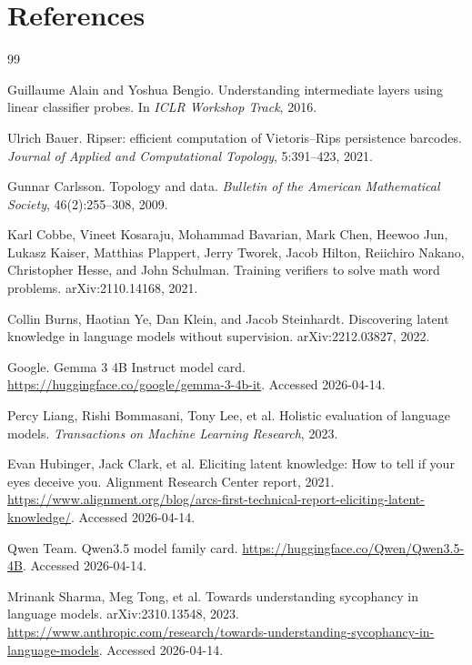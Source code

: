 \documentclass[11pt]{article}
\begin{document}
\section*{References}
\renewcommand{\refname}{}
\begin{thebibliography}{99}

Guillaume Alain and Yoshua Bengio.
\newblock Understanding intermediate layers using linear classifier probes.
\newblock In \emph{ICLR Workshop Track}, 2016.

Ulrich Bauer.
\newblock Ripser: efficient computation of Vietoris--Rips persistence barcodes.
\newblock \emph{Journal of Applied and Computational Topology}, 5:391--423, 2021.

Gunnar Carlsson.
\newblock Topology and data.
\newblock \emph{Bulletin of the American Mathematical Society}, 46(2):255--308, 2009.

Karl Cobbe, Vineet Kosaraju, Mohammad Bavarian, Mark Chen, Heewoo Jun, Lukasz Kaiser, Matthias Plappert, Jerry Tworek, Jacob Hilton, Reiichiro Nakano, Christopher Hesse, and John Schulman.
\newblock Training verifiers to solve math word problems.
\newblock arXiv:2110.14168, 2021.

Collin Burns, Haotian Ye, Dan Klein, and Jacob Steinhardt.
\newblock Discovering latent knowledge in language models without supervision.
\newblock arXiv:2212.03827, 2022.

Google.
\newblock Gemma 3 4B Instruct model card.
\newblock \url{https://huggingface.co/google/gemma-3-4b-it}. Accessed 2026-04-14.

Percy Liang, Rishi Bommasani, Tony Lee, et al.
\newblock Holistic evaluation of language models.
\newblock \emph{Transactions on Machine Learning Research}, 2023.

Evan Hubinger, Jack Clark, et al.
\newblock Eliciting latent knowledge: How to tell if your eyes deceive you.
\newblock Alignment Research Center report, 2021.
\newblock \url{https://www.alignment.org/blog/arcs-first-technical-report-eliciting-latent-knowledge/}. Accessed 2026-04-14.

Qwen Team.
\newblock Qwen3.5 model family card.
\newblock \url{https://huggingface.co/Qwen/Qwen3.5-4B}. Accessed 2026-04-14.

Mrinank Sharma, Meg Tong, et al.
\newblock Towards understanding sycophancy in language models.
\newblock arXiv:2310.13548, 2023.
\newblock \url{https://www.anthropic.com/research/towards-understanding-sycophancy-in-language-models}. Accessed 2026-04-14.


\end{thebibliography}
\end{document}

